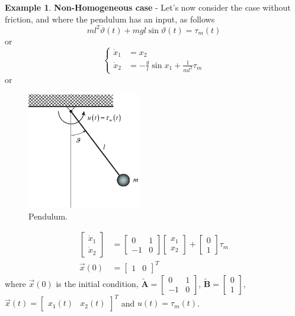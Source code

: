 \documentclass[11pt,a4paper,oneside]{book}
\numberwithin{equation}{section}
\theoremstyle{it}
\theoremstyle{definition}
\newtheorem{example}{Example}[chapter]
\begin{document}
\begin{example}
\noindent\textbf{Non-Homogeneous case} - Let's now consider the case without 
friction, 
and where the pendulum has an input, as follows
\begin{equation}
	ml^2\ddot{\vartheta}(t) + mgl\sin\vartheta(t) = \tau_m(t)
\end{equation}
or
\begin{equation}
	\left\lbrace \begin{aligned}
		\dot{x}_1 &=  x_2 \\[6pt] 
		\dot{x}_2 &= -\frac{g}{l}\sin x_1 + 
		\frac{1}{ml^2}\tau_m
	\end{aligned}\right. 
\end{equation}
or
\begin{figure}[H]
	\centering
	\includegraphics[width = 140pt, 
	keepaspectratio]{figures/pendulum3.eps}
	\captionsetup{width=0.5\textwidth, font=small}		
	\caption{Pendulum.}
	\label{figure_pendulum3}
\end{figure}
\begin{equation}
	\begin{aligned}
		\begin{bmatrix} \dot{x}_1 \\[6pt] \dot{x}_2 \end{bmatrix} &= 
		\begin{bmatrix} 
		0 & 1 \\[6pt] -1 & 0 \end{bmatrix} \begin{bmatrix} {x}_1 
		\\[6pt] {x}_2 
		\end{bmatrix} + \begin{bmatrix} 0 \\[6pt] 1 \end{bmatrix} 
		\tau_m \\[6pt]
		\vec{x}(0) &= \begin{bmatrix} 1 & 0 \end{bmatrix}^T
	\end{aligned}
\end{equation}
where $\vec{x}(0)$ is the initial condition, $\tilde{\mathbf{A}} = 
\begin{bmatrix} 0 
& 1 \\ -1 & 0 \end{bmatrix}$, $\tilde{\mathbf{B}} = \begin{bmatrix} 0 \\ 
1 \end{bmatrix}$, $\vec{x}(t)= \begin{bmatrix} x_1(t) & x_2(t) 
\end{bmatrix}^T$ and $u(t)= \tau_m(t)$.


\end{example}
\end{document}
